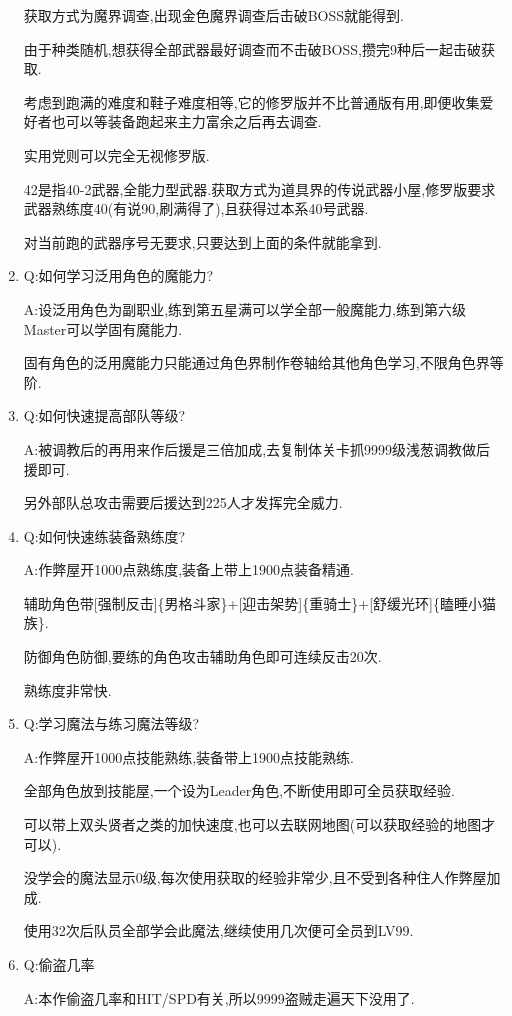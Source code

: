 \begin{enumerate}
	获取方式为魔界调查,出现金色魔界调查后击破BOSS就能得到.

	由于种类随机,想获得全部武器最好调查而不击破BOSS,攒完9种后一起击破获取.

	考虑到跑满的难度和鞋子难度相等,它的修罗版并不比普通版有用,即便收集爱好者也可以等装备跑起来主力富余之后再去调查.

	实用党则可以完全无视修罗版.

	42是指40-2武器,全能力型武器.获取方式为道具界的传说武器小屋,修罗版要求武器熟练度40(有说90,刷满得了),且获得过本系40号武器.

	对当前跑的武器序号无要求,只要达到上面的条件就能拿到.

	\item
	Q:如何学习泛用角色的魔能力?

	A:设泛用角色为副职业,练到第五星满可以学全部一般魔能力,练到第六级Master可以学固有魔能力.

	固有角色的泛用魔能力只能通过角色界制作卷轴给其他角色学习,不限角色界等阶.

	\item
	Q:如何快速提高部队等级?

	A:被调教后的再用来作后援是三倍加成,去复制体关卡抓9999级浅葱调教做后援即可.

	另外部队总攻击需要后援达到225人才发挥完全威力.

	\item
	Q:如何快速练装备熟练度?

	A:作弊屋开1000点熟练度,装备上带上1900点装备精通.

	辅助角色带[强制反击]\{男格斗家\}+[迎击架势]\{重骑士\}+[舒缓光环]\{瞌睡小猫族\}.

	防御角色防御,要练的角色攻击辅助角色即可连续反击20次.

	熟练度非常快.

	\item
	Q:学习魔法与练习魔法等级?
	
	A:作弊屋开1000点技能熟练,装备带上1900点技能熟练.

	全部角色放到技能屋,一个设为Leader角色,不断使用即可全员获取经验.

	可以带上双头贤者之类的加快速度,也可以去联网地图(可以获取经验的地图才可以).

	没学会的魔法显示0级,每次使用获取的经验非常少,且不受到各种住人作弊屋加成.

	使用32次后队员全部学会此魔法,继续使用几次便可全员到LV99.

	\item
	Q:偷盗几率

	A:本作偷盗几率和HIT/SPD有关,所以9999盗贼走遍天下没用了.


\end{enumerate}
